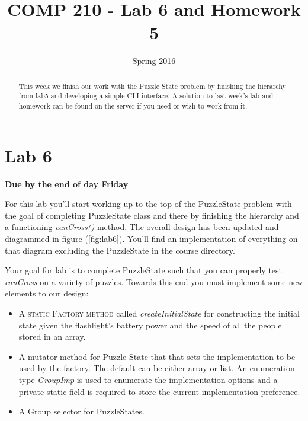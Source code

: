\documentclass[nobib]{tufte-handout}
\title{COMP 210 - Lab 6 and Homework 5}
\date{Spring 2016}
\begin{document}
\maketitle

\begin{abstract}
This week we finish our work with the Puzzle State problem by finishing the hierarchy from lab5 and developing a simple CLI interface. A solution to last week's lab and homework can be found on the server if you need or wish to work from it.
\end{abstract}

\section{Lab 6}

\begin{center}
\textbf{Due by the end of day Friday}
\end{center}

For this lab you'll start working up to the top of the PuzzleState problem with the goal of completing PuzzleState class and there by finishing the hierarchy and a functioning \textit{canCross()} method.  The overall design has been updated and diagrammed in figure (\ref{fig:lab6}). You'll find an implementation of everything on that diagram excluding the PuzzleState in the course directory. 

Your goal for lab is to complete PuzzleState such that you can properly test \textit{canCross} on a variety of puzzles. Towards this end you must implement some new elements to our design:
\begin{itemize}
\item A \textsc{static Factory method} called \textit{createInitialState} for constructing the initial state given the flashlight's battery power and the speed of all the people stored in an array. 
\item A mutator method for Puzzle State that that sets the implementation to be used by the factory. The default can be either array or list. An enumeration type \textit{GroupImp} is used to enumerate the implementation options and a private static field is required to store the current implementation preference. 
\item A Group selector for PuzzleStates.  
\end{itemize}
\end{document}
